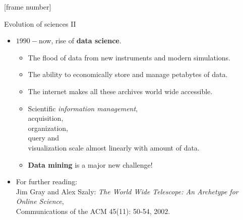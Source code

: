 \documentclass[aspectratio=169,t]{beamer}
\begin{document}
  {
    [frame number]
    \begin{frame}{Evolution of sciences II}
        \begin{itemize}
            \item $1990-$now, rise of \textbf{data science}.
                  \begin{itemize}
                      \item The flood of data from new instruments and modern simulations.
                      \item The ability to economically store and manage petabytes of data.
                      \item The internet makes all these archives world wide accessible.
                      \item Scientific \emph{information management}, \\
                            acquisition,\\
                            organization, \\
                            query and \\
                            visualization scale almost linearly with amount of data.
                      \item \textbf{Data mining} is a major new challenge!
                  \end{itemize}
          \item For further reading:\\
                \small{Jim Gray and Alex Szaly: \emph{The World Wide Telescope: An Archetype for Online Science}, \\ Communications of the ACM 45(11): 50-54, 2002.}
        \end{itemize}
    \end{frame}
  }
\end{document}

